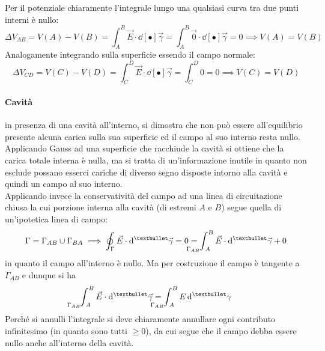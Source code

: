 Per il potenziale chiaramente l'integrale lungo una qualsiasi curva tra due punti interni è nullo:
\[\Delta V_{AB} = V(A) - V(B) = \int_A^B \vec{E} \cdot \dd[•]{\vec{\gamma}} = \int_A^B \vec{0} \cdot \dd[•]{\vec{\gamma}} = 0 \implies V(A) = V(B)\]
Analogamente integrando sulla superficie essendo il campo normale:
\[\Delta V_{CD} = V(C) - V(D) = \int_C^D \vec{E} \cdot \dd[•]{\vec{\gamma}} = \int_C^D 0 = 0 \implies V(C) = V(D)\]


\paragraph{Cavità} in presenza di una cavità all'interno, si dimostra che non può essere all'equilibrio presente alcuna carica sulla sua superficie ed il campo al suo interno resta nullo. 
\\Applicando Gauss ad una superficie che racchiude la cavità si ottiene che la carica totale interna è nulla, ma si tratta di un'informazione inutile in quanto non esclude possano esserci cariche di diverso segno disposte intorno alla cavità e quindi un campo al suo interno.
\\Applicando invece la conservatività del campo ad una linea di circuitazione chiusa la cui porzione interna alla cavità (di estremi $A$ e $B$) segue quella di un'ipotetica linea di campo:
\[\Gamma = \Gamma_{AB} \cup \Gamma_{BA} \implies \oint_\Gamma \vec{E} \cdot \dd[•]{\vec{\gamma}} = 0 = \int_{\hspace{-0.75cm} \Gamma_{AB} \hspace{0.22cm} A}^B \vec{E} \cdot \dd[•]{\vec{\gamma}} + 0 \]
in quanto il campo all'interno è nullo. Ma per costruzione il campo è tangente a $\Gamma_{AB}$ e dunque si ha
\[\int_{\hspace{-0.75cm} \Gamma_{AB} \hspace{0.22cm} A}^B \vec{E} \cdot \dd[•]{\vec{\gamma}} = \int_{\hspace{-0.75cm} \Gamma_{AB} \hspace{0.22cm} A}^B E \dd[•]{\gamma}\]
Perché si annulli l'integrale si deve chiaramente annullare ogni contributo infinitesimo (in quanto sono tutti $\geq 0$), da cui segue che il campo debba essere nullo anche all'interno della cavità.


